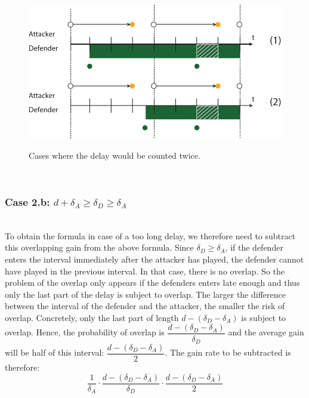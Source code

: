 \begin{figure}[hbtp]
\centering
\caption{Cases where the delay would be counted twice.}
\includegraphics[scale=0.7]{Images/flipcase2nb.pdf}
\label{countedtwice}
\end{figure}

~~ \\
\subsubsection*{\textbf{Case 2.b:} $d + \delta_{A} \geq \delta_{D} \geq \delta_{A}$}
~~~\\

To obtain the formula in case of a too long delay, we therefore need to subtract this overlapping gain from the above formula. 
Since $\delta_{D} \geq \delta_{A}$, if the defender enters the interval immediately after the attacker has played, the defender cannot have played in the previous interval. In that case, there is no overlap. So the problem of the overlap only appears if the defenders enters late enough and thus only the last part of the delay is subject to overlap. The larger the difference between the interval of the defender and the attacker, the smaller the risk of overlap. Concretely, only the last part of length $d - (\delta_{D} - \delta_{A})$ is subject to overlap. Hence, the probability of overlap is $\dfrac{ d - (\delta_{D} - \delta_{A})}{\delta_{D}}$ and the average gain will be half of this interval:  $\dfrac{ d - (\delta_{D} - \delta_{A})}{2}$.  The gain rate to be subtracted is therefore:\\

\begin{equation*}
\dfrac{1} {\delta_{A}} \cdot \dfrac{d - (\delta_{D} - \delta_{A})}{\delta_{D}} \cdot \dfrac{d - (\delta_{D} - \delta_{A})}{2}
\end{equation*}


